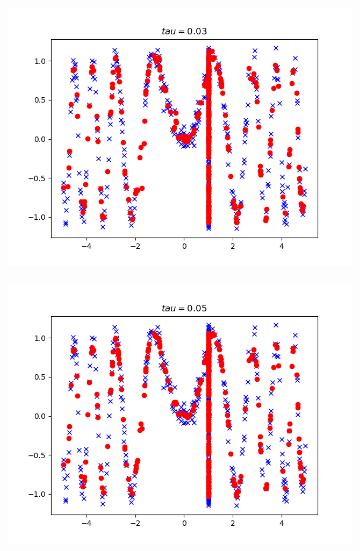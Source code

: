\begin{answer}
\begin{figure}[htbp]
    \begin{subfigure}[b]{0.5\linewidth}
        \centering
        \includegraphics[width=\linewidth]{pics/tau_0d03}
    \end{subfigure}
    \begin{subfigure}[b]{0.5\linewidth}
        \centering
        \includegraphics[width=\linewidth]{pics/tau_0d05}
    \end{subfigure}
    \begin{subfigure}[b]{0.5\linewidth}
        \centering

\end{subfigure}
\end{figure}
\end{answer}
